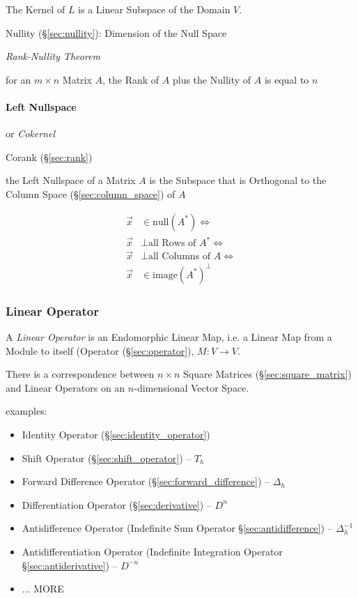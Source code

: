 The Kernel of $L$ is a Linear Subspace of the Domain $V$.

Nullity (\S\ref{sec:nullity}): Dimension of the Null Space

\emph{Rank-Nullity Theorem}

for an $m \times n$ Matrix $A$, the Rank of $A$ plus the Nullity
of $A$ is equal to $n$



\paragraph{Left Nullspace}\label{sec:left_nullspace}\hfill

or \emph{Cokernel}

Corank (\S\ref{sec:rank})

the Left Nullspace of a Matrix $A$ is the Subspace that is Orthogonal to the
Column Space (\S\ref{sec:column_space}) of $A$

\begin{align*}
  \vec{x} & \in \mathrm{null}(A^*) \Leftrightarrow         \\
  \vec{x} & \bot \text{all Rows of }A^* \Leftrightarrow    \\
  \vec{x} & \bot \text{all Columns of }A \Leftrightarrow   \\
  \vec{x} & \in \mathrm{image}(A^*)^\bot
\end{align*}



\subsubsection{Linear Operator}\label{sec:linear_operator}

A \emph{Linear Operator} is an Endomorphic Linear Map, i.e. a Linear Map from a
Module to itself (Operator (\S\ref{sec:operator}), $M : V \rightarrow V$.

There is a correspondence between $n\times{n}$ Square Matrices
(\S\ref{sec:square_matrix}) and Linear Operators on an $n$-dimensional Vector
Space.

examples:
\begin{itemize}
  \item Identity Operator (\S\ref{sec:identity_operator})
  \item Shift Operator (\S\ref{sec:shift_operator}) -- $T_h$
  \item Forward Difference Operator (\S\ref{sec:forward_difference}) --
    $\Delta_h$
  \item Differentiation Operator (\S\ref{sec:derivative}) -- $D^n$
  \item Antidifference Operator (Indefinite Sum Operator
    \S\ref{sec:antidifference}) -- $\Delta^{-1}_h$
  \item Antidifferentiation Operator (Indefinite Integration Operator
    \S\ref{sec:antiderivative}) -- $D^{-n}$
  \item ... MORE
\end{itemize}

